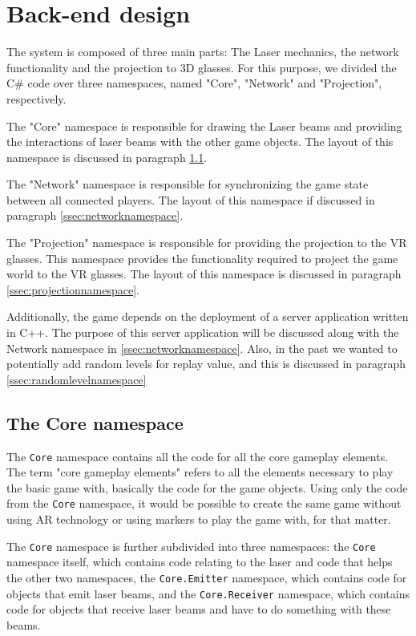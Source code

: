 	\section{Back-end design} \label{sec:backenddesign}
		The system is composed of three main parts: The Laser mechanics, the network
		functionality and the projection to 3D glasses. For this purpose, we divided
		the C\# code over three namespaces, named "Core", "Network" and
		"Projection", respectively.

		The "Core" namespace is responsible for drawing the Laser beams and
		providing the interactions of laser beams with the other game objects.
		The layout of this namespace is discussed in paragraph 
		\ref{ssec:corenamespace}.

		The "Network" namespace is responsible for synchronizing the game state
		between all connected players. The layout of this namespace if discussed 
		in paragraph \ref{ssec:networknamespace}.

		The "Projection" namespace is responsible for providing the projection to
		the VR glasses. This namespace provides the functionality required to project
		the game world to the VR glasses. The layout of this namespace is discussed in
		paragraph \ref{ssec:projectionnamespace}.
		
		Additionally, the game depends on the deployment of a server application
		written in C++. The purpose of this server application will be discussed 
		along with the Network namespace in \ref{ssec:networknamespace}. Also,
		in the past we wanted to potentially add random levels for replay value,
		and this is discussed in paragraph \ref{ssec:randomlevelnamespace}
		
		\subsection{The Core namespace} \label{ssec:corenamespace}
			The \texttt{Core} namespace contains all the code for all the core gameplay
			elements. The term "core gameplay elements" refers to all the
			elements necessary to play the basic game with, basically the code
			for the game objects. Using only the code from the \texttt{Core} namespace,
			it would be possible to create the same game without using AR
			technology or using markers to play the game with, for that matter.
			
			The \texttt{Core} namespace is further subdivided into three namespaces:
			the \texttt{Core} namespace itself, which contains code relating to the laser
			and code that helps the other two namespaces, the 
			\texttt{Core.Emitter} namespace, which contains code for objects 
			that emit laser beams, and the \texttt{Core.Receiver} namespace, 
			which contains code for objects that receive laser beams and have to 
			do something with these beams.
			
